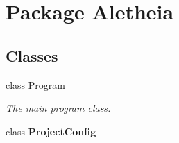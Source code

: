 \hypertarget{namespace_aletheia}{}\section{Package Aletheia}
\label{namespace_aletheia}
\subsection*{Classes}
\begin{DoxyCompactItemize}
\item 
class \hyperlink{class_aletheia_1_1_program}{Program}
\begin{DoxyCompactList}\small\item\em The main program class. \end{DoxyCompactList}\item 
class {\bfseries Project\+Config}
\end{DoxyCompactItemize}
